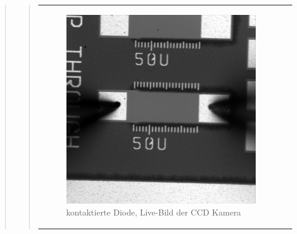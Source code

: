 \begin{quote}
\begin{quote}
\begin{center}
\begin{tabular}{ll}
                \hspace{-10em}
                    \begin{minipage}{0.6\textwidth}
    
                        \begin{figure}[H]
                            \label{fig:}
                            \includegraphics[scale=0.25, trim = 0cm 0cm 0cm
                            0cm,
                            clip]{./Emissionsbilder/vier/nach_Kontaktierung.jpg}
                            \caption{kontaktierte Diode, Live-Bild der CCD
                            Kamera}
                        \end{figure}
    
                    \end{minipage}
                    \begin{minipage}{0.6\textwidth}
    

\end{minipage}
\end{tabular}
\end{center}
\end{quote}
\end{quote}
